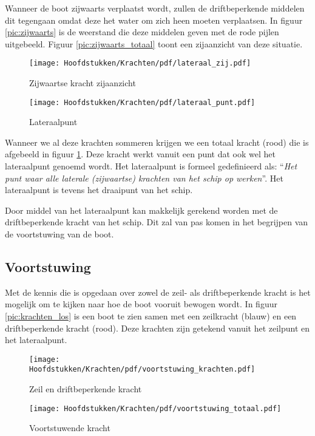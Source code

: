 Wanneer de boot zijwaarts verplaatst wordt, zullen de driftbeperkende middelen dit tegengaan omdat deze het water om zich heen moeten verplaatsen. In figuur \ref{pic:zijwaarts} is de weerstand die deze middelen geven met de rode pijlen uitgebeeld. Figuur \ref{pic:zijwaarts_totaal} toont een zijaanzicht van deze situatie.

\begin{figure}[H]
	\centering
	\begin{minipage}[b]{0.48\textwidth}
		\centering
		\texttt{[image: Hoofdstukken/Krachten/pdf/lateraal\_zij.pdf]}
		\caption{Zijwaartse kracht zijaanzicht}
		\label{pic:zijwaarts_totaal}
	\end{minipage}
	\hfill
	\begin{minipage}[b]{0.48\textwidth}
		\centering
		\texttt{[image: Hoofdstukken/Krachten/pdf/lateraal\_punt.pdf]}
		\caption{Lateraalpunt}
		\label{pic:lateraal}
	\end{minipage}
\end{figure}

Wanneer we al deze krachten sommeren krijgen we een totaal kracht (rood) die is afgebeeld in figuur \ref{pic:lateraal}. Deze kracht werkt vanuit een punt dat ook wel het lateraalpunt genoemd wordt. Het lateraalpunt is formeel gedefinieerd als: ``\textit{Het punt waar alle laterale (zijwaartse) krachten van het schip op werken}''. Het lateraalpunt is tevens het draaipunt van het schip.

Door middel van het lateraalpunt kan makkelijk gerekend worden met de driftbeperkende kracht van het schip. Dit zal van pas komen in het begrijpen van de voortstuwing van de boot.

\newpage
\subsection{Voortstuwing}
Met de kennis die is opgedaan over zowel de zeil- als driftbeperkende kracht is het mogelijk om te kijken naar hoe de boot vooruit bewogen  wordt. In figuur \ref{pic:krachten_los} is een boot te zien samen met een zeilkracht (blauw) en een driftbeperkende kracht (rood). Deze krachten zijn getekend vanuit het zeilpunt en het lateraalpunt.

\begin{figure}[H]
	\centering
	\begin{minipage}[b]{0.48\textwidth}
		\centering
		\texttt{[image: Hoofdstukken/Krachten/pdf/voortstuwing\_krachten.pdf]}
		\caption{Zeil en driftbeperkende kracht}
		\label{pic:krachten_los}
	\end{minipage}
	\hfill
	\begin{minipage}[b]{0.48\textwidth}
		\centering
		\texttt{[image: Hoofdstukken/Krachten/pdf/voortstuwing\_totaal.pdf]}
		\caption{Voortstuwende kracht}
		\label{pic:voorwaardse_kracht}
	\end{minipage}
\end{figure}

